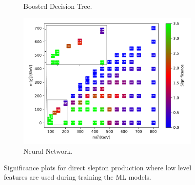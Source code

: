 \begin{figure}[H]
\begin{subfigure}[t!]{0.49\textwidth}
    \caption{Boosted Decision Tree.}
        \label{fig:signLowSlepSlepBDT}
    \end{subfigure}      
    \begin{subfigure}[t!]{0.49\textwidth}
    \includegraphics[width = \textwidth]{Figures/Significances/significance_NN_slepslep_Low_level.pdf}
    \caption{Neural Network.}
        \label{fig:signLowSlepSlepNN}
    \end{subfigure}
    \caption{Significance plots for direct slepton production where low level features are used during training the ML models.}
    \label{fig:signLowSlepSlep}
\end{figure}

